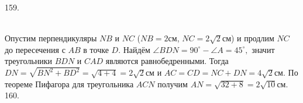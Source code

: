 \documentclass[12pt]{article}
\begin{document}
159. \begin{figure}[ht!]
\end{figure}\\
Опустим перпендикуляры $NB$ и $NC$ ($NB=2$см, $NC=2\sqrt{2}$см) и продлим $NC$ до пересечения с $AB$ в точке $D.$ Найдём $\angle BDN=90^\circ-\angle A=45^\circ,$ значит треугольники $BDN$ и $CAD$ являются равнобедренными. Тогда $DN=\sqrt{BN^2+BD^2}=\sqrt{4+4}=2\sqrt{2}$см и $AC=CD=NC+DN=4\sqrt{2}$см. По теореме Пифагора для треугольника $ACN$ получим $AN=\sqrt{32+8}=2\sqrt{10}$см.\\
160. \begin{figure}[ht!]
\end{figure}\\
\end{document}
